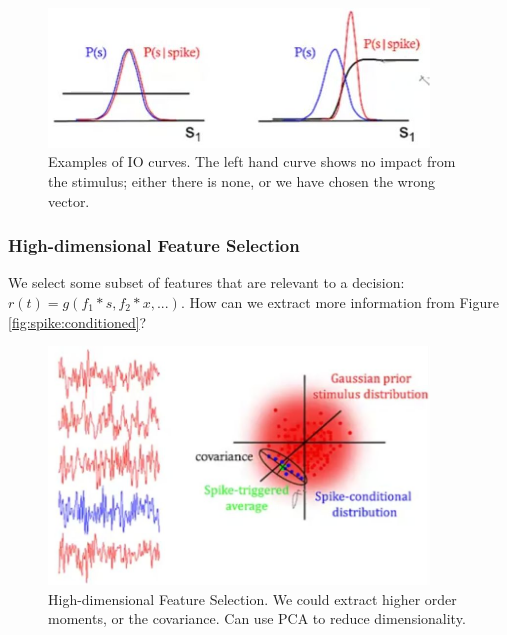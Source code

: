 \documentclass[]{article}
\begin{document}
\begin{figure}[H]
	\caption[Examples of IO curves]{Examples of IO curves. The left hand curve shows no impact from the stimulus; either there is none, or we have chosen the wrong vector.}\label{fig:sample-io-curves}
	\includegraphics[width=0.9\textwidth]{sample-io-curves}
\end{figure}

\subsubsection{High-dimensional Feature Selection}

We select some subset of features that are relevant to a decision: $r(t)=g(f_1*s, f_2*x,...)$. How can we extract more information from Figure \ref{fig:spike:conditioned}?

\begin{figure}[H]
	\caption[High-dimensional Feature Selection]{High-dimensional Feature Selection. We could extract higher order moments, or the covariance. Can use PCA to reduce dimensionality.}
	\includegraphics[width=0.9\textwidth]{spike-conditioned-distribution-covariance}
\end{figure}
\end{document}
